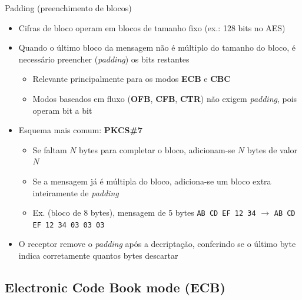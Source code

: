 \documentclass{beamer}
\begin{document}
\begin{frame}{Padding (preenchimento de blocos)}

\begin{itemize}
    \item Cifras de bloco operam em blocos de tamanho fixo (ex.: 128 bits no AES)
    \item Quando o último bloco da mensagem não é múltiplo do tamanho do bloco, é necessário preencher (\textit{padding}) os bits restantes
    \begin{itemize}
        \item Relevante principalmente para os modos \textbf{ECB} e \textbf{CBC}
        \item Modos baseados em fluxo (\textbf{OFB}, \textbf{CFB}, \textbf{CTR}) não exigem \textit{padding}, pois operam bit a bit
    \end{itemize}
    \item Esquema mais comum: \textbf{PKCS\#7}
    \begin{itemize}
        \item Se faltam $N$ bytes para completar o bloco, adicionam-se $N$ bytes de valor $N$
        \item Se a mensagem já é múltipla do bloco, adiciona-se um bloco extra inteiramente de \textit{padding}
        \item Ex. (bloco de 8 bytes), mensagem de 5 bytes \texttt{AB CD EF 12 34} $\to$ \texttt{AB CD EF 12 34 03 03 03}
    \end{itemize}
    \item O receptor remove o \textit{padding} após a decriptação, conferindo se o último byte indica corretamente quantos bytes descartar
\end{itemize}

\end{frame}

\subsection{Electronic Code Book mode (ECB)}
\end{document}
